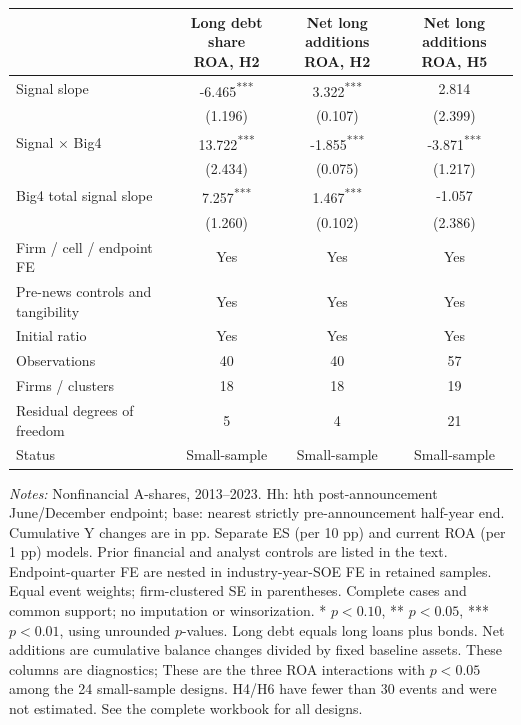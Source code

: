 \documentclass[10pt]{article}
\newcommand{\sym}[1]{\textsuperscript{#1}}
\begin{document}
\begin{minipage}{22cm}\fontsize{10.5}{13}\selectfont\centering
\setlength{\tabcolsep}{4pt}\renewcommand{\arraystretch}{1.12}
\begin{tabular*}{\textwidth}{@{\extracolsep{\fill}}lccc@{}}\toprule
 & \shortstack{Long debt share\\ROA, H2} & \shortstack{Net long additions\\ROA, H2} & \shortstack{Net long additions\\ROA, H5} \\
\midrule
Signal slope & -6.465\sym{***} & 3.322\sym{***} & 2.814 \\
 & (1.196) & (0.107) & (2.399) \\
Signal $\times$ Big4 & 13.722\sym{***} & -1.855\sym{***} & -3.871\sym{***} \\
 & (2.434) & (0.075) & (1.217) \\
Big4 total signal slope & 7.257\sym{***} & 1.467\sym{***} & -1.057 \\
 & (1.260) & (0.102) & (2.386) \\
Firm / cell / endpoint FE & Yes & Yes & Yes \\
Pre-news controls and tangibility & Yes & Yes & Yes \\
Initial ratio & Yes & Yes & Yes \\
Observations & 40 & 40 & 57 \\
Firms / clusters & 18 & 18 & 19 \\
Residual degrees of freedom & 5 & 4 & 21 \\
Status & Small-sample & Small-sample & Small-sample \\
\bottomrule\end{tabular*}
\par\medskip\raggedright\fontsize{9}{11}\selectfont
\textit{Notes:} Nonfinancial A-shares, 2013--2023. Hh: hth post-announcement June/December endpoint; base: nearest strictly pre-announcement half-year end. Cumulative Y changes are in pp. Separate ES (per 10 pp) and current ROA (per 1 pp) models. Prior financial and analyst controls are listed in the text. Endpoint-quarter FE are nested in industry-year-SOE FE in retained samples. Equal event weights; firm-clustered SE in parentheses. Complete cases and common support; no imputation or winsorization. * $p<0.10$, ** $p<0.05$, *** $p<0.01$, using unrounded $p$-values. Long debt equals long loans plus bonds. Net additions are cumulative balance changes divided by fixed baseline assets. These columns are diagnostics; These are the three ROA interactions with $p<0.05$ among the 24 small-sample designs. H4/H6 have fewer than 30 events and were not estimated. See the complete workbook for all designs.
\end{minipage}
\end{document}
